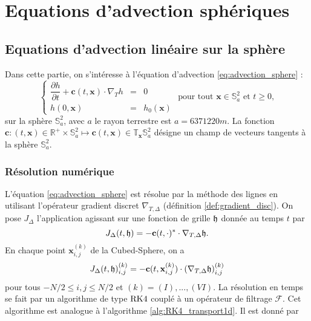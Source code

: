 
\chapter{Equations d'advection sphériques}
\label{chap:advection}

\section{Equations d'advection linéaire sur la sphère}

Dans cette partie, on s'intéresse à l'équation d'advection \eqref{eq:advection_sphere} :
\begin{equation}
\left\lbrace
\begin{array}{rcl}
\dfrac{\partial h}{\partial t} + \mathbf{c}(t,\mathbf{x}) \cdot \nabla_T h & = & 0 \\
h(0,\mathbf{x}) & = & h_0(\mathbf{x})
\end{array}
\right. \text{ pour tout } \mathbf{x} \in \mathbb{S}_a^2 \text{ et } t \geq 0,
\label{eq:advection_sphere}
\end{equation}
sur la sphère $\mathbb{S}_a^2$, avec $a$ le rayon terrestre est $a = 6 371 220 \si{m}$.
La fonction $\mathbf{c} : (t,\mathbf{x}) \in \mathbb{R}^+ \times \mathbb{S}_a^2 \mapsto \mathbf{c}(t,\mathbf{x}) \in \mathbb{T}_{\mathbf{x}} \mathbb{S}_a^2$ désigne un champ de vecteurs tangents à la sphère $\mathbb{S}_a^2$.

\subsection{Résolution numérique}

L'équation \eqref{eq:advection_sphere} est résolue par la méthode des lignes en utilisant l'opérateur gradient discret $\nabla_{T,\Delta}$ (définition \ref{def:gradient_disc}). On pose $J_{\Delta}$ l'application agissant sur une fonction de grille $\mathfrak{h}$ donnée au temps $t$ par
\begin{equation}
J_{\Delta}(t, \mathfrak{h}) = - \mathbf{c}(t,\cdot)^* \cdot \nabla_{T,\Delta} \mathfrak{h}.
\end{equation}
En chaque point $\mathbf{x}_{i,j}^{(k)}$ de la Cubed-Sphere, on a
\begin{equation}
J_{\Delta}(t, \mathfrak{h})_{i,j}^{(k)} = - \mathbf{c}(t,\mathbf{x}_{i,j}^{(k)}) \cdot \left(\nabla_{T,\Delta} \mathfrak{h}\right)_{i,j}^{(k)}
\end{equation}
pour tous $-N/2 \leq i,j \leq N/2$ et $(k) = (I), ..., (VI)$.
La résolution en temps se fait par un algorithme de type $\RK4$ couplé à un opérateur de filtrage $\mathcal{F}$. Cet algorithme est analogue à l'algorithme \ref{alg:RK4_transport1d}. Il est donné par 

